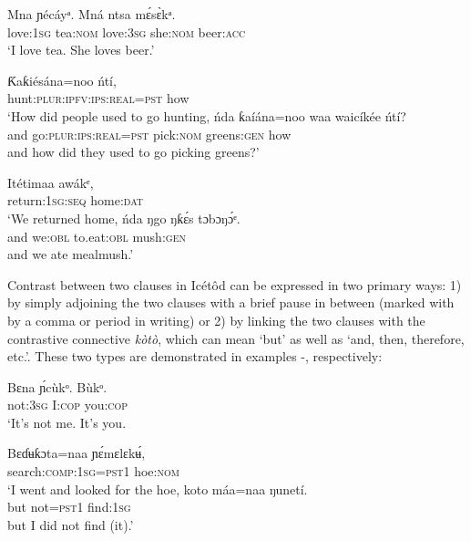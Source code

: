 \ea\label{ex:syn:61}
\gll M{\Í}n{\Í}a     ɲécáyᵃ.   M{\Í}ná       ntsa   m\'{ɛ}s\`{ɛ}kᵃ. \\
love:\textsc{1sg}   tea:\textsc{nom}   love:\textsc{3sg} she:\textsc{nom}   beer:\textsc{acc}    \\
\glt ‘I love tea. She loves beer.’ 
\z




\ea\label{ex:syn:62}
  \ea
  \gll Ƙaƙiésána=noo       ńtí, \\
hunt:\textsc{plur:ipfv:ips:real=pst}   how \\
  \glt ‘How did people used to go hunting,
  \medskip
  \ex
  \gll ńda   ƙaíána=noo         waa   waicíkée     ńtí?  \\
     and   go:\textsc{plur:ips:real=pst} pick:\textsc{nom} greens:\textsc{gen} how  \\
  \glt and how did they used to go picking greens?’
  \z
\z




\ea\label{ex:syn:63}
  \ea
  \gll Itétimaa awákᵉ, \\
return:\textsc{1sg:seq} home:\textsc{dat}     \\
  \glt ‘We returned home, 
  \medskip
  \ex
  \gll ńda  ŋgo     ŋƙ\'{ɛ}s{\Í}     tɔbɔŋ\'{ɔ}ᵉ. \\
and   we:\textsc{obl}   to.eat:\textsc{obl}   mush:\textsc{gen}    \\
  \glt and we ate mealmush.’
  \z
\z

Contrast between two clauses in Icétôd can be expressed in two primary ways: 1) by simply adjoining the two clauses with a brief pause in between (marked with by a comma or period in writing) or 2) by linking the two clauses with the contrastive connective \textit{kòtò}, which can mean ‘but’ as well as ‘and, then, therefore, etc.’. These two types are demonstrated in examples -, respectively:



\ea\label{ex:syn:64}
\gll Bɛna     \'{ɲ}cùkᵒ.     Bùkᵒ. \\
not:\textsc{3sg}   I:\textsc{cop}     you:\textsc{cop}    \\
\glt ‘It’s not me. It’s you. 
\z




\ea\label{ex:syn:65}
  \ea
  \gll Bɛɗʉƙɔt{\Í}a=naa     ɲ\'{ɛ}mɛlɛk\'{ʉ}, \\
search:\textsc{comp:1sg=pst1}   hoe:\textsc{nom}    \\
  \glt ‘I went and looked for the hoe, 
  \medskip
  \ex
  \gll koto   máa=naa   ŋunetí. \\
but   not=\textsc{pst1}   find:\textsc{1sg}    \\
  \glt but I did not find (it).’
  \z 
\z

